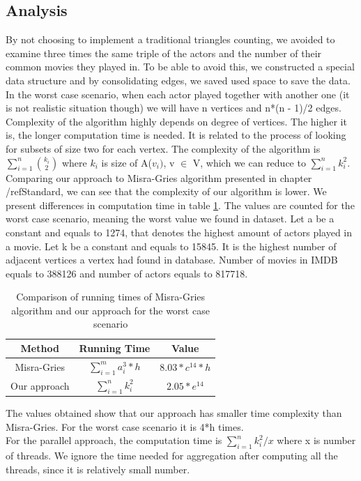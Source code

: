 \subsection{Analysis}
By not choosing to implement a traditional triangles counting, we avoided to examine three times the same triple of the actors and the number of their common movies they played in. To be able to avoid this, we constructed a special data structure and by consolidating edges, we saved used space to save the data.
In the worst case scenario, when each actor played together with another one (it is not realistic situation though) we will have n vertices and n*(n - 1)/2 edges.
\\
Complexity of the algorithm highly depends on degree of vertices. The higher it is, the longer computation time is needed. It is related to the process of looking for subsets of size two for each vertex. The complexity of the algorithm is \(\sum\limits_{i=1}^n{k_i \choose 2}\) where \(k_i\) is size of A(\(v_i)\), v \(\in\) V, which we can reduce to \(\sum\limits_{i=1}^n{k_i^2}\).
\\
Comparing our approach to Misra-Gries algorithm presented in chapter /ref{Standard}, we can see that the complexity of our algorithm is lower. We present differences in computation time in table \ref{comparison}. The values are counted for the worst case scenario, meaning the worst value we found in dataset. Let a be a constant and equals to 1274, that denotes the highest amount of actors played in a movie. Let k be a constant and equals to 15845. It is the highest number of adjacent vertices a vertex had found in database. Number of movies in IMDB equals to 388126 and number of actors equals to 817718. 
\begin{table}[ht]
\caption{Comparison of running times of Misra-Gries algorithm and our approach for the worst case scenario}
\centering
\begin{tabular}{c c c}
\hline\hline
Method & Running Time & Value \\ [0.5ex]
\hline
Misra-Gries&\(\sum\limits_{i=1}^m{a_i^3}*h\)&\(8.03*c^{14} * h\)\\
Our approach&\(\sum\limits_{i=1}^n{k_i^2}\)&\(2.05*e^{14}\)\\
\hline
\end{tabular}
\label{comparison}
\end{table}
The values obtained show that our approach has smaller time complexity than Misra-Gries. For the worst case scenario it is 4*h times.
\\
For the parallel approach, the computation time is \(\sum\limits_{i=1}^n{k_i^2}/x\) where x is number of threads. We ignore the time needed for aggregation after computing all the threads, since it is relatively small number.
